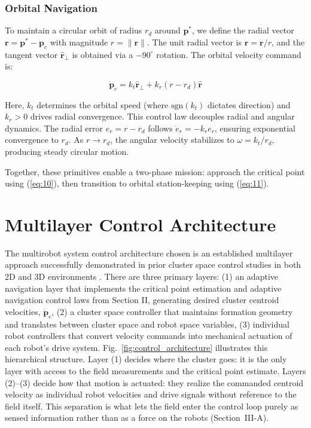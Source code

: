 \documentclass[lettersize,journal]{IEEEtran}
\begin{document}
\subsubsection{Orbital Navigation}
To maintain a circular orbit of radius $r_d$ around $\mathbf{p}^*$, we define the radial vector $\mathbf{r} = \mathbf{p}^* - \mathbf{p}_c$ with magnitude $r = \|\mathbf{r}\|$. The unit radial vector is $\hat{\mathbf{r}} = \mathbf{r}/r$, and the tangent vector $\hat{\mathbf{r}}_\perp$ is obtained via a $-90^\circ$ rotation. The orbital velocity command is:

\begin{equation}\label{eq:11}
\dot{\mathbf{p}}_c = k_t \hat{\mathbf{r}}_\perp + k_r(r - r_d)\hat{\mathbf{r}}
\end{equation}

Here, $k_t$ determines the orbital speed (where $\text{sgn}(k_t)$ dictates direction) and $k_r > 0$ drives radial convergence.
This control law decouples radial and angular dynamics. The radial error $e_r = r - r_d$ follows $\dot{e}_r = -k_r e_r$, ensuring exponential convergence to $r_d$. As $r \to r_d$, the angular velocity stabilizes to $\omega = k_t/r_d$, producing steady circular motion.

Together, these primitives enable a two-phase mission: approach the critical point using (\ref{eq:10}), then transition to orbital station-keeping using (\ref{eq:11}).

\section{Multilayer Control Architecture}


The multirobot system control architecture chosen is an established multilayer approach successfully demonstrated in prior cluster space control studies in both 2D and 3D environments \cite{5,8}. There are three primary layers: (1) an adaptive navigation layer that implements the critical point estimation and adaptive navigation control laws from Section II, generating desired cluster centroid velocities, $\dot{\mathbf{p}}_c$, (2) a cluster space controller that maintains formation geometry and translates between cluster space and robot space variables, (3) individual robot controllers that convert velocity commands into mechanical actuation of each robot's drive system. Fig.~\ref{fig:control_architecture} illustrates this hierarchical structure. Layer (1) decides where the cluster goes: it is the only layer with access to the field measurements and the critical point estimate. Layers (2)--(3) decide how that motion is actuated: they realize the commanded centroid velocity as individual robot velocities and drive signals without reference to the field itself. This separation is what lets the field enter the control loop purely as sensed information rather than as a force on the robots (Section~III-A).
\end{document}
